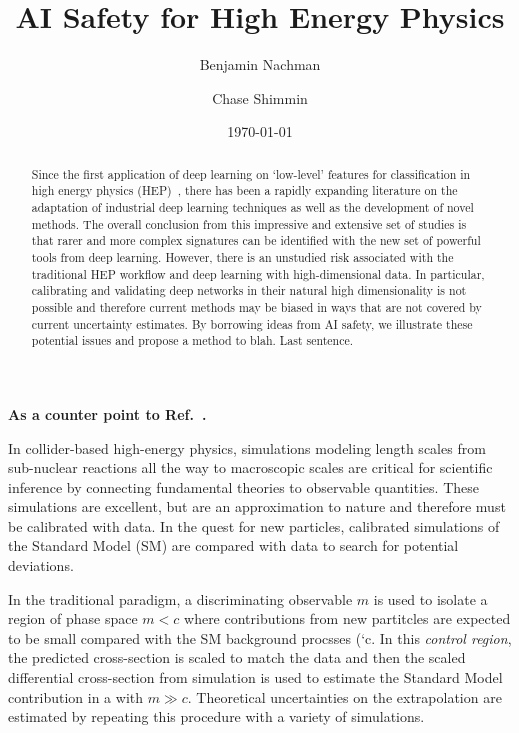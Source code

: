 \documentclass[reprint,nofootinbib,...]{revtex4-1}
\begin{document}
\title{AI Safety for High Energy Physics}

\author{Benjamin Nachman}


\author{Chase Shimmin}


\begin{abstract}
Since the first application of deep learning on `low-level' features for classification in high energy physics (HEP)~\cite{Baldi:2014kfa}, there has been a rapidly expanding literature on the adaptation of industrial deep learning techniques as well as the development of novel methods.  The overall conclusion from this impressive and extensive set of studies is that rarer and more complex signatures can be identified with the new set of powerful tools from deep learning.  However, there is an unstudied risk associated with the traditional HEP workflow and deep learning with high-dimensional data.  In particular, calibrating and validating deep networks in their natural high dimensionality is not possible and therefore current methods may be biased in ways that are not covered by current uncertainty estimates.  By borrowing ideas from AI safety, we illustrate these potential issues and propose a method to blah.  Last sentence.
\end{abstract}

\date{\today}
\maketitle


\textbf{As a counter point to Ref.~\cite{Baldi:2014kfa}.}

In collider-based high-energy physics, simulations modeling length scales from sub-nuclear reactions all the way to macroscopic scales are critical for scientific inference by connecting fundamental theories to observable quantities.  These simulations are excellent, but are an approximation to nature and therefore must be calibrated with data. In the quest for new particles, calibrated simulations of the Standard Model (SM) are compared with data to search for potential deviations.

In the traditional paradigm, a discriminating observable $m$ is used to isolate a region of phase space $m<c$ where contributions from new partitcles are expected to be small compared with the SM background procsses (`c.  In this \textit{control region}, the predicted cross-section is scaled to match the data and then the scaled differential cross-section from simulation is used to estimate the Standard Model contribution in a  with $m\gg c$.  Theoretical uncertainties on the extrapolation are estimated by repeating this procedure with a variety of simulations.
\end{document}
